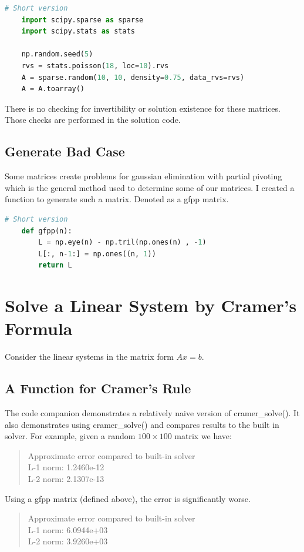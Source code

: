 \documentclass[12pt]{article}
\begin{document}
\begin{lstlisting}[language=Python]
	# Short version
	import scipy.sparse as sparse
	import scipy.stats as stats

	np.random.seed(5) 
	rvs = stats.poisson(18, loc=10).rvs
	A = sparse.random(10, 10, density=0.75, data_rvs=rvs)
	A = A.toarray()
\end{lstlisting}

There is no checking for invertibility or solution existence for these matrices. Those checks are performed in the solution code.

\subsection{Generate Bad Case}
Some matrices create problems for gaussian elimination with partial pivoting which is the general method used to determine some of our matrices. I created a function to generate such a matrix. Denoted as a gfpp matrix.
\begin{lstlisting}[language=Python]
	# Short version
	def gfpp(n):
		L = np.eye(n) - np.tril(np.ones(n) , -1)
		L[:, n-1:] = np.ones((n, 1))
		return L
\end{lstlisting}

\section{Solve a Linear System by Cramer's Formula}
Consider the linear systems in the matrix form $Ax =b$.

\subsection{A Function for Cramer's Rule}
The code companion demonstrates a relatively naive version of cramer\_solve(). It also demonstrates using cramer\_solve() and compares results to the built in solver. For example, given a random $100\times 100$ matrix we have:
\begin{quote}
	Approximate error compared to built-in solver \\
	L-1 norm: 1.2460e-12 \\
	L-2 norm: 2.1307e-13
\end{quote}
Using a gfpp matrix (defined above), the error is significantly worse.
\begin{quote}
	Approximate error compared to built-in solver \\
	L-1 norm: 6.0944e+03 \\
	L-2 norm: 3.9260e+03
\end{quote}
\end{document}
